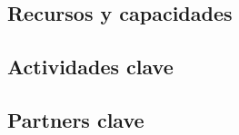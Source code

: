 

\begin{itemize}
\end{itemize}

\subsection{Recursos y capacidades}


\begin{itemize}
\end{itemize}

\subsection{Actividades clave}


\subsection{Partners clave}

